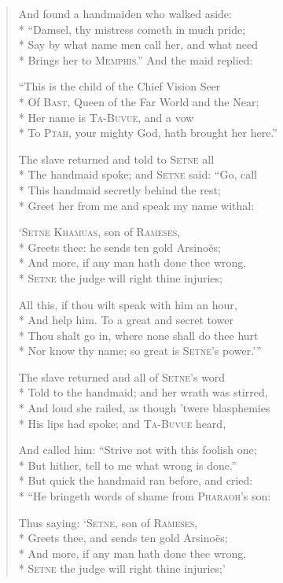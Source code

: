 \documentclass[12pt]{article}
\newcommand{\vin}{\hspace{1em}}
\begin{document}
\begin{verse}
And found a handmaiden who walked aside:\\*
``Damsel, thy mistress cometh in much pride;\\*
\vin Say by what name men call her, and what need\\*
Brings her to \textsc{Memphis}.'' And the maid replied:

``This is the child of the Chief Vision Seer\\*
Of \textsc{Bast}, Queen of the Far World and the Near;\\*
\vin Her name is \textsc{Ta-Buvu\"{e}}, and a vow\\*
To \textsc{Ptah}, your mighty God, hath brought her here.''

The slave returned and told to \textsc{Setne} all\\*
The handmaid spoke; and \textsc{Setne} said: ``Go, call\\*
\vin This handmaid secretly behind the rest;\\*
Greet her from me and speak my name withal:

`\textsc{Setne Khamuas}, son of \textsc{Rameses},\\*
Greets thee: he sends ten gold Arsino\"{e}s;\\*
\vin And more, if any man hath done thee wrong,\\*
\textsc{Setne} the judge will right thine injuries;

All this, if thou wilt speak with him an hour,\\*
And help him. To a great and secret tower\\*
\vin Thou shalt go in, where none shall do thee hurt\\*
Nor know thy name; so great is \textsc{Setne}'s power.'{''}

The slave returned and all of \textsc{Setne}'s word\\*
Told to the handmaid; and her wrath was stirred,\\*
\vin And loud she railed, as though 'twere blasphemies\\*
His lips had spoke; and \textsc{Ta-Buvu\"{e}} heard,

And called him: ``Strive not with this foolish one;\\*
But hither, tell to me what wrong is done.''\\*
\vin But quick the handmaid ran before, and cried:\\*
``He bringeth words of shame from \textsc{Pharaoh}'s son:

Thus saying: `\textsc{Setne}, son of \textsc{Rameses},\\*
Greets thee, and sends ten gold Arsino\"{e}s;\\*
\vin And more, if any man hath done thee wrong,\\*
\textsc{Setne} the judge will right thine injuries;'


\end{verse}
\end{document}
